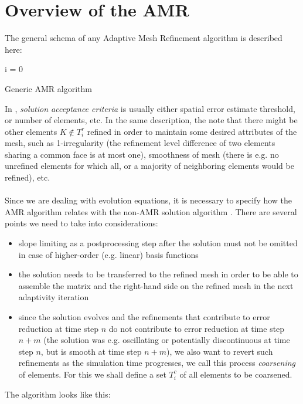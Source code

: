 \section{Overview of the AMR}
The general schema of any Adaptive Mesh Refinement algorithm is described here:
\begin{algorithm}[H]
\label{AMRGen}
 i = 0\\
 \caption{Generic AMR algorithm}
\end{algorithm}
In , \textit{solution acceptance criteria} is usually either spatial error estimate threshold, or number of elements, etc. In the same description, the note that there might be other elements $K \notin T^{r}_i$ refined in order to maintain some desired attributes of the mesh, such as 1-irregularity (the refinement level difference of two elements sharing a common face is at most one), smoothness of mesh (there is e.g. no unrefined elements for which all, or a majority of neighboring elements would be refined), etc.

\paragraph{}
Since we are dealing with evolution equations, it is necessary to specify how the AMR algorithm relates with the non-AMR solution algorithm . There are several points we need to take into considerations:
\begin{itemize}
	\item slope limiting as a postprocessing step after the solution must not be omitted in case of higher-order (e.g. linear) basis functions
	\item the solution needs to be transferred to the refined mesh in order to be able to assemble the matrix and the right-hand side on the refined mesh in the next adaptivity iteration
	\item since the solution evolves and the refinements that contribute to error reduction at time step $n$ do not contribute to error reduction at time step $n + m$ (the solution was e.g. oscillating or potentially discontinuous at time step $n$, but is smooth at time step $n + m$), we also want to revert such refinements as the simulation time progresses, we call this process \textit{coarsening} of elements. For this we shall define a set $T^{c}_i$ of all elements to be coarsened.
\end{itemize}
The algorithm looks like this:


